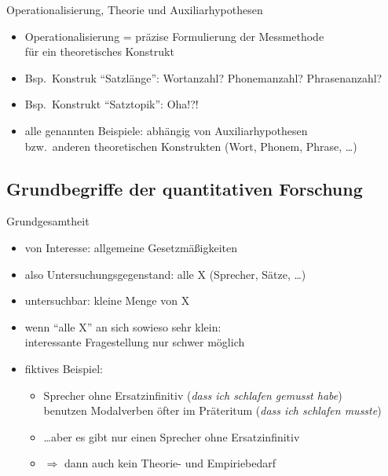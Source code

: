 \begin{frame}
  {Operationalisierung, Theorie und Auxiliarhypothesen}
  \begin{itemize}[<+->]
    \item Operationalisierung = präzise Formulierung der Messmethode\\
      für ein theoretisches Konstrukt
    \item Bsp.\ Konstruk "`Satzlänge"': Wortanzahl? Phonemanzahl? Phrasenanzahl?
    \item Bsp.\ Konstrukt "`Satztopik"': Oha!?! \citep{CookBildhauer2013}
    \item alle genannten Beispiele: \alert{abhängig von Auxiliarhypothesen}\\
      bzw.\ anderen theoretischen Konstrukten (Wort, Phonem, Phrase, \dots)
  \end{itemize}
\end{frame}

\subsection{Grundbegriffe der quantitativen Forschung}

\begin{frame}
  {Grundgesamtheit}
  \begin{itemize}[<+->]
    \item von Interesse: allgemeine Gesetzmäßigkeiten
    \item also Untersuchungsgegenstand: \alert{alle X} (Sprecher, Sätze, \dots)
    \item untersuchbar: kleine Menge von X
    \item wenn "`alle X"' an sich sowieso sehr klein:\\
      interessante Fragestellung nur schwer möglich
      \Zeile
    \item fiktives Beispiel:
      \begin{itemize}[<+->]
	\item Sprecher ohne Ersatzinfinitiv (\textit{dass ich schlafen gemusst habe})\\
	  benutzen Modalverben öfter im Präteritum (\textit{dass ich schlafen musste})
	\item \dots aber es gibt nur einen Sprecher ohne Ersatzinfinitiv
	\item $\Rightarrow$ dann auch kein Theorie- und Empiriebedarf
      \end{itemize}
  \end{itemize}
\end{frame}

